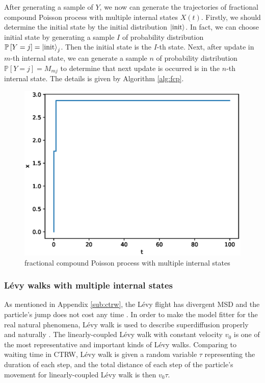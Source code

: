 \documentclass[aps, pre, preprint, amsmath, amssymb]{revtex4}
\renewcommand{\P}{\mathbb{P}}
\newcommand{\zhongkuo}[1]{\left[#1\right]}
\begin{document}
After generating a sample of $Y$, we now can generate the trajectories of fractional compound Poisson process with multiple internal states $X(t)$.
Firstly, we should determine the initial state by the initial distribution $\ket{\textnormal{init}}$. 
In fact, we can choose initial state by generating a sample $I$ of probability distribution $\P\zhongkuo{Y=j}=\ket{\textnormal{init}}_{j}$. 
Then the initial state is the $I$-th state. Next, after update in $m$-th internal state, we can generate a sample $n$ of probability distribution $\P\zhongkuo{Y=j}=M_{mj}$ to determine that next update is occurred is in the $n$-th internal state. The details is given by Algorithm \ref{alg:fcp}.

\begin{figure}[H]
\centering
\includegraphics[scale=0.5]{figures/fcp}
\caption{fractional compound Poisson process with multiple internal states}
\end{figure}


\subsubsection{L\'{e}vy walks with multiple internal states}
As mentioned in Appendix \ref{sub:ctrw}, the L\'{e}vy flight has divergent MSD and the particle's jump does not cost any time \cite{metzler2000random}. In order to make the model fitter for the real natural phenomena, L\'{e}vy walk is used to describe superdiffusion properly and naturally \cite{2015,shlesinger1986levy}. The linearly-coupled L\'{e}vy walk with constant velocity $v_0$ is one of the most representative and important kinds of L\'{e}vy walks.
Comparing to waiting time in CTRW, L\'{e}vy walk is given a random variable $\tau$ representing the duration of each step, and the total distance of each step of the particle’s movement for linearly-coupled L\'{e}vy walk is then $v_0\tau$.
\end{document}
